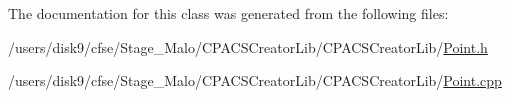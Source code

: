 The documentation for this class was generated from the following files\-:\begin{DoxyCompactItemize}
\item 
/users/disk9/cfse/\-Stage\-\_\-\-Malo/\-C\-P\-A\-C\-S\-Creator\-Lib/\-C\-P\-A\-C\-S\-Creator\-Lib/\hyperlink{Point_8h}{Point.\-h}\item 
/users/disk9/cfse/\-Stage\-\_\-\-Malo/\-C\-P\-A\-C\-S\-Creator\-Lib/\-C\-P\-A\-C\-S\-Creator\-Lib/\hyperlink{Point_8cpp}{Point.\-cpp}\end{DoxyCompactItemize}
